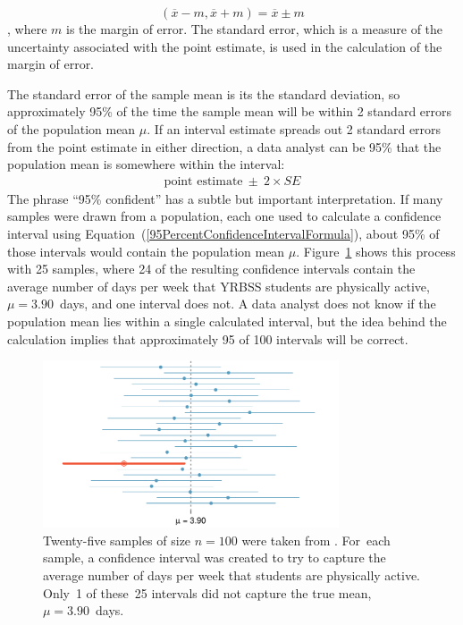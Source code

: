\begin{spacing}{1.5}
\[
     (\overline{x} -m, \overline{x} + m) = \overline{x} \pm m 
\],
where $m$ is the margin of error. 
The standard error, which is a measure of the uncertainty associated with the point estimate, is used in the calculation of the margin of error.  


The standard error of the sample mean is its the standard deviation, so approximately 95\% of the time the sample mean will be within 2 standard errors of the population  mean $\mu$. If an interval estimate spreads out 2 standard errors from the point estimate in either direction, a data analyst can be 95\%  that the population mean is somewhere within the interval:
\begin{eqnarray}
\text{point estimate}\ \pm\ 2\times SE
\label{95PercentConfidenceIntervalFormula}
\end{eqnarray}
The phrase  ``95\% confident'' has a subtle but important interpretation. If many samples were drawn from a population, each one used to calculate a confidence interval using Equation~(\ref{95PercentConfidenceIntervalFormula}), about 95\% of those intervals would contain the population mean $\mu$. 
Figure~\ref{95PercentConfidenceInterval} shows this process with 25 samples, where 24 of the resulting confidence intervals contain the average number of days per week that YRBSS students are physically active, $\mu=3.90$~days, and one interval does not.  A data analyst does not know if the population mean lies within a single calculated interval, but the idea behind the calculation implies that approximately 95 of 100 intervals will be correct.  

\begin{figure}[hht]
   \centering
   \includegraphics[width=0.78\textwidth]
{ch_inference_foundations_oi_biostat/figures/95PercentConfidenceInterval/95PercentConfidenceInterval}
   \caption{Twenty-five samples of size $n=100$ were taken from . For~each sample, a confidence interval was created to try to capture the average number of days per week that students are physically active. Only~1 of these~25 intervals did not capture the true mean, $\mu = 3.90$~days.}
   \label{95PercentConfidenceInterval}
\end{figure}


\end{spacing}
